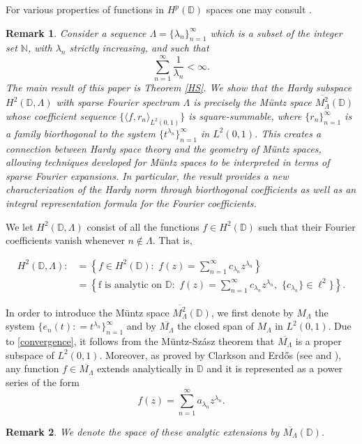 \documentclass[11pt, a4paper]{article}
\newtheorem{remark}{Remark}[section]
\begin{document}
For various properties of functions in $H^p(\mathbb{D})$ spaces one may consult \cite{Duren,Jevtic,Koosis,Mashreghi}.


\begin{remark}
Consider a sequence $\Lambda=\{\lambda_n\}_{n=1}^{\infty}$ which is a subset of the integer set $\mathbb{N}$,
with $\lambda_n$ strictly increasing, and such that
\begin{equation}\label{convergence}
\sum_{n=1}^{\infty} \frac{1}{\lambda_n}<\infty.
\end{equation}
The main result of this paper is Theorem \ref{HS}. We show that the Hardy subspace $H^2 (\mathbb{D}, \Lambda)$ with sparse Fourier spectrum $\Lambda$ is precisely the M\"{u}ntz space $\overline{M^2_{\Lambda}}(\mathbb{D})$ whose coefficient sequence
$\{\langle f, r_n\rangle_{L^2 (0,1)}\}$ is square-summable, where $\{r_n\}_{n=1}^{\infty}$ is a family
biorthogonal to the system $\{t^{\lambda_n}\}_{n=1}^{\infty}$ in $L^2(0,1)$.
This creates a connection between Hardy space theory and the geometry of M\"{u}ntz spaces, allowing techniques developed for M\"{u}ntz spaces
to be interpreted in terms of sparse Fourier expansions. In particular, the result provides a new characterization of the Hardy norm through biorthogonal coefficients as well as an integral representation formula for the Fourier coefficients.
\end{remark}


We let $H^2 (\mathbb{D}, \Lambda)$ consist of all the functions $f\in H^2 (\mathbb{D})$
such that their Fourier coefficients vanish whenever $n\notin \Lambda$.
That is,


\begin{align*}
H^2(\mathbb{D}, \Lambda): & = \left\{f\in H^2(\mathbb{D}):\,\, f(z)=\sum_{n=1}^{\infty} c_{\lambda_n} z^{\lambda_n}\right\}\\
& =  \left\{\text{f is analytic on $\mathbb{D}$}:\,\, f(z)=\sum_{n=1}^{\infty} c_{\lambda_n} z^{\lambda_n},\,\,
\{c_{\lambda_n}\}\in \ell^2\}\right\}.
\end{align*}


In order to introduce the M\"{u}ntz space $\overline{M^2_{\Lambda}}(\mathbb{D})$, we first
denote by $M_{\Lambda}$ the system $\{e_n(t): = t^{\lambda_n}\}_{n=1}^{\infty}$ and by $\overline{M_{\Lambda}}$ the closed span of
$M_{\Lambda}$ in $L^2 (0,1)$. Due to \eqref{convergence}, it follows from the M\"{u}ntz-Sz\'{a}sz theorem that $\overline{M_{\Lambda}}$
is a proper subspace of $L^2 (0,1)$. Moreover, as proved by Clarkson and Erd\H{o}s
(see \cite{CE} and \cite[Corollary 6.2.4]{Gurariy}),
any function $f\in\overline{M_{\Lambda}}$ extends analytically in $\mathbb{D}$ and it is represented as a power series of the form
\begin{equation}\label{analyticext}
f(z)=\sum_{n=1}^{\infty} a_{\lambda_n} z^{\lambda_n}.
\end{equation}
\begin{remark}
We denote the space of these analytic extensions by $\overline{M_{\Lambda}}(\mathbb{D})$.
\end{remark}
\end{document}
